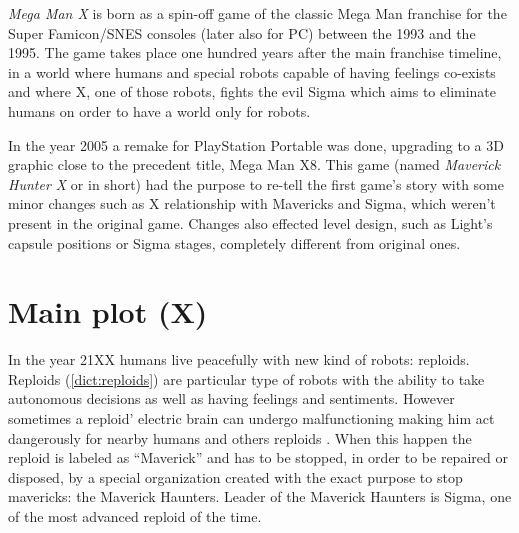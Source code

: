 
\textit{Mega Man X} is born as a spin-off game of the classic Mega Man franchise for the Super Famicon/SNES consoles (later also for PC)  between the 1993 and the 1995\cite{wiki:MMX}. The game takes place one hundred years after the main franchise timeline, in a world where humans and special robots capable of having feelings co-exists and where X, one of those robots, fights the evil Sigma which aims to eliminate humans on order to have a world only for robots.

In the year 2005 a remake for PlayStation Portable was done, upgrading to a 3D graphic close to the precedent title, Mega Man X8. This game (named \textit{Maverick Hunter X }or \mhx in short) had the purpose to re-tell the first game's story with some minor changes such as X relationship with Mavericks and Sigma, which weren't present in the original game. Changes also effected level design, such as Light's capsule positions or Sigma stages, completely different from original ones.
\section[Main plot]{Main plot (X)}
In the year 21XX humans live peacefully with new kind of robots: reploids. Reploids (\ref{dict:reploids}) are particular type of robots with the ability to take autonomous decisions as well as having feelings and sentiments\cite{Xcoll1:Manual_X1}. However sometimes  a reploid' electric brain can undergo  malfunctioning making him act dangerously for nearby humans and others reploids . When this happen the reploid is labeled as ``Maverick'' and has to be stopped, in order to be repaired or disposed, by a special organization created with the exact purpose to stop mavericks: the Maverick Haunters. Leader of the Maverick Haunters is Sigma, one of the most advanced reploid of the time. 

